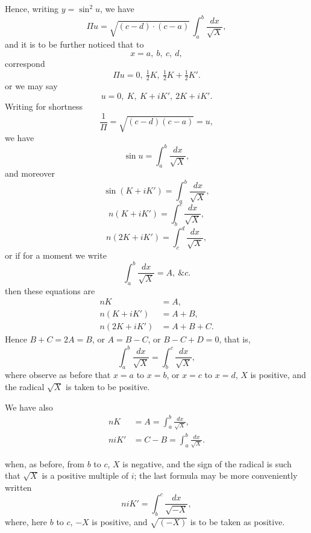\documentclass[12pt,a4paper,oneside]{book}
\theoremstyle{plain}
\theoremstyle{definition}
\theoremstyle{remark}
\begin{document}
\newpage
Hence, writing $y=\sin^2 u$, we have
\[
\Pi u=\sqrt{(c-d)\cdot(c-a)}\,\int_a^b\frac{dx}{\sqrt{X}},
\]
and it is to be further noticed that to
\[
x=a,\ b,\ c,\ d,
\]
correspond
\[
\Pi u=0,\ \tfrac{1}{2}K,\ \tfrac{1}{2}K+\tfrac{1}{2}K'.
\]
or we may say
\[
u=0,\ K,\ K+iK',\ 2K+iK'.
\]
Writing for shortness
\[
\frac{1}{\Pi}=\sqrt{(c-d)(c-a)}=u,
\]
we have
\[
\sin u=\int_a^b\frac{dx}{\sqrt{X}},
\]
and moreover
\[
\sin(K+iK')=\int_a^b\frac{dx}{\sqrt{X}},
\]
\[
n(K+iK')=\int_b^c\frac{dx}{\sqrt{X}},
\]
\[
n(2K+iK')=\int_c^d\frac{dx}{\sqrt{X}},
\]
or if for a moment we write
\[
\int_a^b\frac{dx}{\sqrt{X}}=A,\ \&c.
\]
then these equations are
\begin{align*}
nK&=A,\\
n(K+iK')&=A+B,\\
n(2K+iK')&=A+B+C.
\end{align*}
Hence $B+C=2A=B$, or $A=B-C$, or $B-C+D=0$, that is,
\[
\int_a^b\frac{dx}{\sqrt{X}}=\int_b^c\frac{dx}{\sqrt{X}},
\]
where observe as before that $x=a$ to $x=b$, or $x=c$ to $x=d$, $X$ is positive, and the radical $\sqrt{X}$ is taken to be positive.

We have also
\begin{align*}
nK&=A=\int_a^b\frac{dx}{\sqrt{X}},\\
niK'&=C-B=\int_a^b\frac{dx}{\sqrt{X}}.
\end{align*}

\newpage
when, as before, from $b$ to $c$, $X$ is negative, and the sign of the radical is such that $\sqrt{X}$ is a positive multiple of $i$; the last formula may be more conveniently written
\[
n iK'=\int_b^c\frac{dx}{\sqrt{-X}},
\]
where, here $b$ to $c$, $-X$ is positive, and $\sqrt{(-X)}$ is to be taken as positive.
\end{document}
